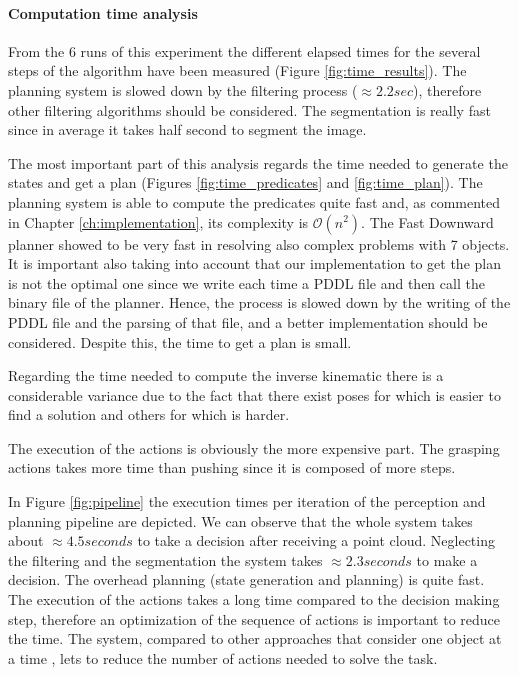 

\paragraph{Computation time analysis}
From the 6 runs of this experiment the different elapsed times for the several steps of the algorithm have been measured (Figure \ref{fig:time_results}). The planning system is slowed down by the filtering process ($\approx 2.2sec$), therefore other filtering algorithms should be considered. The segmentation is really fast since in average it takes half second to segment the image.

The most important part of this analysis regards the time needed to generate the states and get a plan (Figures \ref{fig:time_predicates} and \ref{fig:time_plan}). The planning system is able to compute the predicates quite fast and, as commented in Chapter \ref{ch:implementation}, its complexity is $\mathcal{O}(n^2)$. The Fast Downward planner showed to be very fast in resolving also complex problems with 7 objects. It is important also taking into account that our implementation to get the plan is not the optimal one since we write each time a PDDL file and then call the binary file of the planner. Hence, the process is slowed down by the writing of the PDDL file and the parsing of that file, and a better implementation should be considered. Despite this, the time to get a plan is small.

Regarding the time needed to compute the inverse kinematic there is a considerable variance due to the fact that there exist poses for which is easier to find a solution and others for which is harder. 

The execution of the actions is obviously the more expensive part. The grasping actions takes more time than pushing since it is composed of more steps.

In Figure \ref{fig:pipeline} the execution times per iteration of the perception and planning pipeline are depicted. We can observe that the whole system takes about $\approx 4.5 seconds$ to take a decision after receiving a point cloud. Neglecting the filtering and the segmentation the system takes $\approx 2.3 seconds$ to make a decision. The overhead planning (state generation and planning) is quite fast.
The execution of the actions takes a long time compared to the decision making step, therefore an optimization of the sequence of actions is important to reduce the time.  The system, compared to other approaches that consider one object at a time \cite{Dogar2011}, lets to reduce the number of actions needed to solve the task. 

